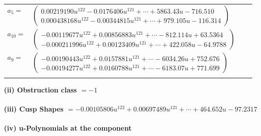 \documentclass[1p]{elsarticle_modified}
\theoremstyle{definition}
\begin{document}
\begin{tabular}{m{7pt} m{180pt} m{7pt} m{180pt} }
\flushright $a_{5}=$&$\begin{pmatrix}0.00219190 u^{122}-0.0176406 u^{121}+\cdots+5863.43 u-716.510\\0.000438168 u^{122}-0.00344815 u^{121}+\cdots+979.105 u-116.314\end{pmatrix}$ \\
\flushright $a_{10}=$&$\begin{pmatrix}-0.00119677 u^{122}+0.00856883 u^{121}+\cdots-812.114 u+63.5364\\-0.000211996 u^{122}+0.00123409 u^{121}+\cdots+422.058 u-64.9788\end{pmatrix}$ \\
\flushright $a_{9}=$&$\begin{pmatrix}-0.00190443 u^{122}+0.0157881 u^{121}+\cdots-6034.26 u+752.676\\-0.00194277 u^{122}+0.0160788 u^{121}+\cdots-6183.07 u+771.699\end{pmatrix}$\\&\end{tabular}
\flushleft \textbf{(ii) Obstruction class $= -1$}\\~\\
\flushleft \textbf{(iii) Cusp Shapes $= -0.00105806 u^{122}+0.00697489 u^{121}+\cdots+464.652 u-97.2317$}\\~\\
\newpage\renewcommand{\arraystretch}{1}
\flushleft \textbf{(iv) u-Polynomials at the component}\newline \\
\end{document}

